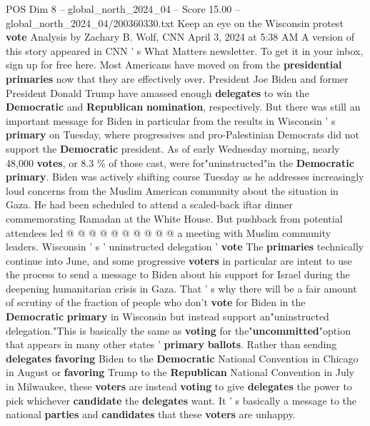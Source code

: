 \begin{textsample}{POS Dim 8 – global\_north\_2024\_04 – Score 15.00 – global\_north\_2024\_04/200360330.txt}  \label{ex:f8_pos_052}
Keep an eye on the Wisconsin protest \textbf{vote} Analysis by Zachary B.
Wolf, CNN April 3, 2024 at 5:38 AM A version of this story appeared in CNN ' s What Matters newsletter.
To get it in your inbox, sign up for free here.
Most Americans have moved on from the \textbf{presidential} \textbf{primaries} now that they are effectively over.
President Joe Biden and former President Donald Trump have amassed enough \textbf{delegates} to win the \textbf{Democratic} and \textbf{Republican} \textbf{nomination}, respectively.
But there was still an important message for Biden in particular from the results in Wisconsin ' s \textbf{primary} on Tuesday, where progressives and pro-Palestinian Democrats did not support the \textbf{Democratic} president.
As of early Wednesday morning, nearly 48,000 \textbf{votes}, or 8.3 \% of those cast, were for"uninstructed"in the \textbf{Democratic} \textbf{primary}.
Biden was actively shifting course Tuesday as he addresses increasingly loud concerns from the Muslim American community about the situation in Gaza.
He had been scheduled to attend a scaled-back iftar dinner commemorating Ramadan at the White House.
But pushback from potential attendees led @ @ @ @ @ @ @ @ @ @ a meeting with Muslim community leaders.
Wisconsin ' s ' uninstructed delegation ' \textbf{vote} The \textbf{primaries} technically continue into June, and some progressive \textbf{voters} in particular are intent to use the process to send a message to Biden about his support for Israel during the deepening humanitarian crisis in Gaza.
That ' s why there will be a fair amount of scrutiny of the fraction of people who don't \textbf{vote} for Biden in the \textbf{Democratic} \textbf{primary} in Wisconsin but instead support an"uninstructed delegation."This is basically the same as \textbf{voting} for the"\textbf{uncommitted}"option that appears in many other states ' \textbf{primary} \textbf{ballots}.
Rather than sending \textbf{delegates} \textbf{favoring} Biden to the \textbf{Democratic} National Convention in Chicago in August or \textbf{favoring} Trump to the \textbf{Republican} National Convention in July in Milwaukee, these \textbf{voters} are instead \textbf{voting} to give \textbf{delegates} the power to pick whichever \textbf{candidate} the \textbf{delegates} want.
It ' s basically a message to the national \textbf{parties} and \textbf{candidates} that these \textbf{voters} are unhappy.

\end{textsample}

